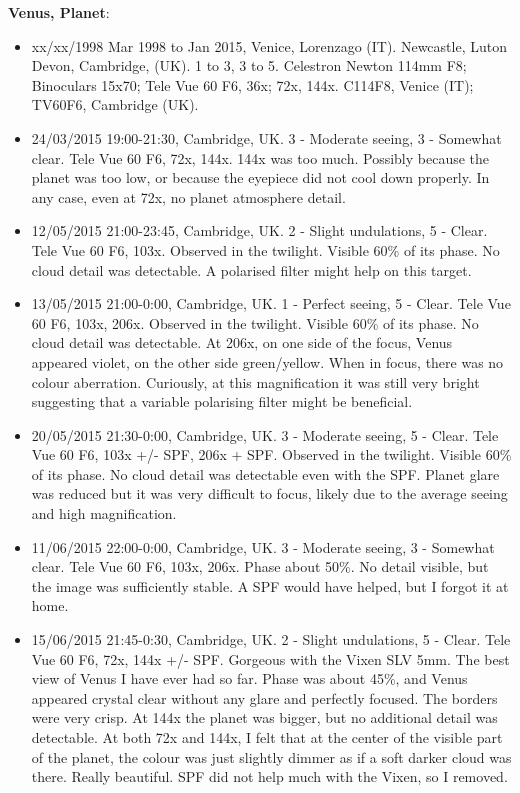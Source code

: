 {\bf Venus, Planet}:
\begin{itemize}
\item xx/xx/1998 Mar 1998 to Jan 2015, Venice, Lorenzago (IT). Newcastle, Luton Devon, Cambridge, (UK). 1 to 3, 3 to 5. Celestron Newton 114mm F8; Binoculars 15x70; Tele Vue 60 F6, 36x; 72x, 144x. C114F8, Venice (IT); TV60F6, Cambridge (UK).
\item 24/03/2015 19:00-21:30, Cambridge, UK. 3 - Moderate seeing, 3 - Somewhat clear. Tele Vue 60 F6, 72x, 144x. 144x was too much. Possibly because the planet was too low, or because the eyepiece did not cool down properly. In any case, even at 72x, no planet atmosphere detail. 
\item 12/05/2015 21:00-23:45, Cambridge, UK. 2 - Slight undulations, 5 - Clear. Tele Vue 60 F6, 103x. Observed in the twilight. Visible 60\% of its phase. No cloud detail was detectable. A polarised filter might help on this target.
\item 13/05/2015 21:00-0:00, Cambridge, UK. 1 - Perfect seeing, 5 - Clear. Tele Vue 60 F6, 103x, 206x. Observed in the twilight. Visible 60\% of its phase. No cloud detail was detectable. At 206x, on one side of the focus, Venus appeared violet, on the other side green/yellow. When in focus, there was no colour aberration. Curiously, at this magnification it was still very bright suggesting that a variable polarising filter might be beneficial. 
\item 20/05/2015 21:30-0:00, Cambridge, UK. 3 - Moderate seeing, 5 - Clear. Tele Vue 60 F6, 103x +/- SPF, 206x + SPF. Observed in the twilight. Visible 60\% of its phase. No cloud detail was detectable even with the SPF. Planet glare was reduced but it was very difficult to focus, likely due to the average seeing and high magnification.
\item 11/06/2015 22:00-0:00, Cambridge, UK. 3 - Moderate seeing, 3 - Somewhat clear. Tele Vue 60 F6, 103x, 206x. Phase about 50\%. No detail visible, but the image was sufficiently stable. A SPF would have helped, but I forgot it at home. 
\item 15/06/2015 21:45-0:30, Cambridge, UK. 2 - Slight undulations, 5 - Clear. Tele Vue 60 F6, 72x, 144x +/- SPF. Gorgeous with the Vixen SLV 5mm. The best view of Venus I have ever had so far. Phase was about 45\%, and Venus appeared crystal clear without any glare and perfectly focused. The borders were very crisp. At 144x the planet was bigger, but no additional detail was detectable. At both 72x and 144x, I felt that at the center of the visible part of the planet, the colour was just slightly dimmer as if a soft darker cloud was there. Really beautiful. SPF did not help much with the Vixen, so I removed.

\end{itemize}
